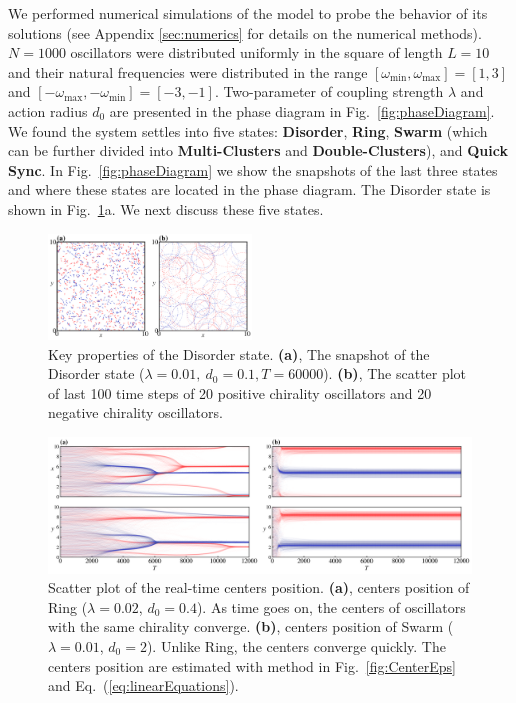 \documentclass[%
 aip,
 amsmath,amssymb,
 reprint,%
]{revtex4-1}
\begin{document}
We performed numerical simulations of the model to probe the behavior of its solutions (see Appendix \ref{sec:numerics} for details on the numerical methods). 
$N=1000$ oscillators were distributed uniformly in the square of length $L=10$ and their natural frequencies were distributed in the range $\left[ \omega _{\min},\omega _{\max} \right]=\left[ 1,3 \right]$ and $\left[ -\omega _{\max},-\omega _{\min} \right]=\left[ -3,-1 \right]$.
Two-parameter of coupling strength $\lambda$ and action radius $d_0$ are presented in the phase diagram in Fig.~\ref{fig:phaseDiagram}. We found the system settles into five states: \textbf{Disorder}, \textbf{Ring}, \textbf{Swarm} (which can be further divided into \textbf{Multi-Clusters} and \textbf{Double-Clusters}), and \textbf{Quick Sync}. In Fig.~\ref{fig:phaseDiagram} we show the snapshots of the last three states and where these states are located in the phase diagram. The Disorder state is shown in Fig.~\ref{fig:disorderState}a.
We next discuss these five states.

\begin{figure}[b]
    \includegraphics[width=0.48\textwidth]{./figs/disorderState.pdf}
    \caption{
        \label{fig:disorderState} Key properties of the Disorder state. 
        \textbf{(a)}, The snapshot of the Disorder state ($\lambda=0.01,\ d_0=0.1, T=60000$). 
        \textbf{(b)}, The scatter plot of last 100 time steps of 20 positive chirality oscillators and 20 negative chirality oscillators.
    }
\end{figure}

\begin{figure}
    \includegraphics[width=\textwidth]{./figs/centersPosition.png}
    \caption{
        \label{fig:centersPosition} Scatter plot of the real-time centers position. 
        \textbf{(a)}, centers position of Ring ($\lambda=0.02$, $d_0=0.4$). As time goes on, the centers of oscillators with the same chirality converge.
        \textbf{(b)}, centers position of Swarm ($\lambda=0.01$, $d_0=2$). Unlike Ring, the centers converge quickly.
        The centers position are estimated with method in Fig.~\ref{fig:CenterEps} and Eq.~(\ref{eq:linearEquations}).
    }
\end{figure}
\end{document}
